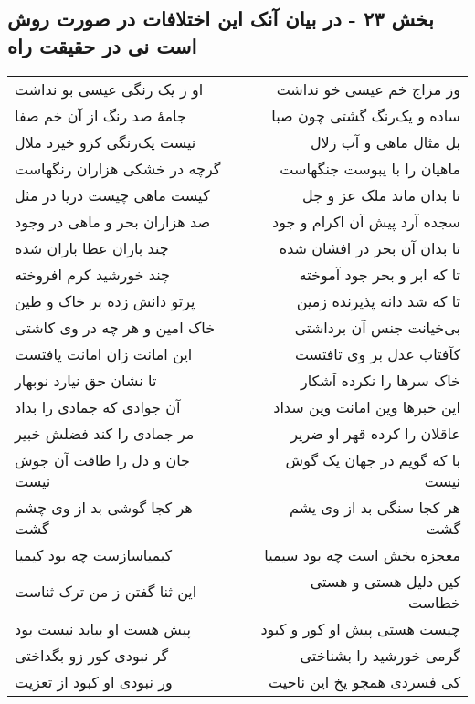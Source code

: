 \begin{center}
\section*{بخش ۲۳ - در بیان آنک این اختلافات در صورت روش است نی در حقیقت راه}
\label{sec:sh023}
\begin{longtable}{l p{0.5cm} r}
او ز یک رنگی عیسی بو نداشت
&&
وز مزاج خم عیسی خو نداشت
\\
جامهٔ صد رنگ از آن خم صفا
&&
ساده و یک‌رنگ گشتی چون صبا
\\
نیست یک‌رنگی کزو خیزد ملال
&&
بل مثال ماهی و آب زلال
\\
گرچه در خشکی هزاران رنگهاست
&&
ماهیان را با یبوست جنگهاست
\\
کیست ماهی چیست دریا در مثل
&&
تا بدان ماند ملک عز و جل
\\
صد هزاران بحر و ماهی در وجود
&&
سجده آرد پیش آن اکرام و جود
\\
چند باران عطا باران شده
&&
تا بدان آن بحر در افشان شده
\\
چند خورشید کرم افروخته
&&
تا که ابر و بحر جود آموخته
\\
پرتو دانش زده بر خاک و طین
&&
تا که شد دانه پذیرنده زمین
\\
خاک امین و هر چه در وی کاشتی
&&
بی‌خیانت جنس آن برداشتی
\\
این امانت زان امانت یافتست
&&
کآفتاب عدل بر وی تافتست
\\
تا نشان حق نیارد نوبهار
&&
خاک سرها را نکرده آشکار
\\
آن جوادی که جمادی را بداد
&&
این خبرها وین امانت وین سداد
\\
مر جمادی را کند فضلش خبیر
&&
عاقلان را کرده قهر او ضریر
\\
جان و دل را طاقت آن جوش نیست
&&
با که گویم در جهان یک گوش نیست
\\
هر کجا گوشی بد از وی چشم گشت
&&
هر کجا سنگی بد از وی یشم گشت
\\
کیمیاسازست چه بود کیمیا
&&
معجزه بخش است چه بود سیمیا
\\
این ثنا گفتن ز من ترک ثناست
&&
کین دلیل هستی و هستی خطاست
\\
پیش هست او بباید نیست بود
&&
چیست هستی پیش او کور و کبود
\\
گر نبودی کور زو بگداختی
&&
گرمی خورشید را بشناختی
\\
ور نبودی او کبود از تعزیت
&&
کی فسردی همچو یخ این ناحیت
\\
\end{longtable}
\end{center}
